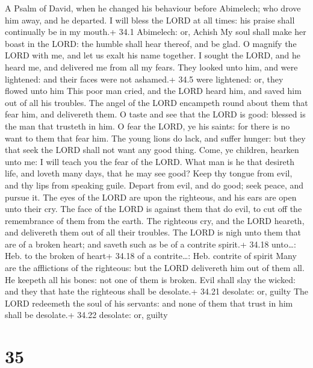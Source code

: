 A Psalm of David, when he changed his behaviour before Abimelech; who
drove him away, and he departed.  I will bless the LORD at
all times: his praise shall continually be in my mouth.+ 34.1 Abimelech:
or, Achish  My soul shall make her boast in the LORD: the
humble shall hear thereof, and be glad.  O magnify the LORD
with me, and let us exalt his name together.  I sought the
LORD, and he heard me, and delivered me from all my fears. 
They looked unto him, and were lightened: and their faces were not
ashamed.+ 34.5 were lightened: or, they flowed unto him 
This poor man cried, and the LORD heard him, and saved him out of all
his troubles.  The angel of the LORD encampeth round about
them that fear him, and delivereth them.  O taste and see
that the LORD is good: blessed is the man that trusteth in him.
 O fear the LORD, ye his saints: for there is no want to
them that fear him.  The young lions do lack, and suffer
hunger: but they that seek the LORD shall not want any good thing.
 Come, ye children, hearken unto me: I will teach you the
fear of the LORD.  What man is he that desireth life, and
loveth many days, that he may see good?  Keep thy tongue
from evil, and thy lips from speaking guile.  Depart from
evil, and do good; seek peace, and pursue it.  The eyes of
the LORD are upon the righteous, and his ears are open unto their cry.
 The face of the LORD is against them that do evil, to cut
off the remembrance of them from the earth.  The righteous
cry, and the LORD heareth, and delivereth them out of all their
troubles.  The LORD is nigh unto them that are of a broken
heart; and saveth such as be of a contrite spirit.+ 34.18 unto\ldots:
Heb. to the broken of heart+ 34.18 of a contrite\ldots: Heb. contrite of
spirit  Many are the afflictions of the righteous: but the
LORD delivereth him out of them all.  He keepeth all his
bones: not one of them is broken.  Evil shall slay the
wicked: and they that hate the righteous shall be desolate.+ 34.21
desolate: or, guilty  The LORD redeemeth the soul of his
servants: and none of them that trust in him shall be desolate.+ 34.22
desolate: or, guilty

\hypertarget{section-34}{%
\section{35}\label{section-34}}

